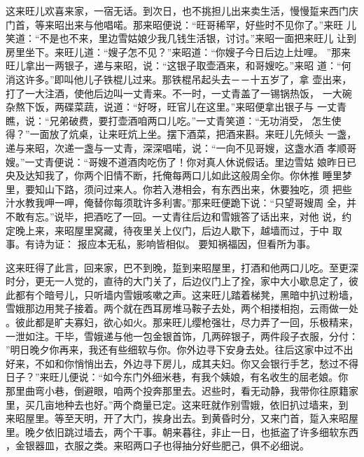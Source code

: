 这来旺儿欢喜来家，一宿无话。到次日，也不挑担儿出来卖生活，慢慢踅来西门庆
门首，等来昭出来与他唱喏。那来昭便说：“旺哥稀罕，好些时不见你了。”来旺
儿笑道：“不是也不来，里边雪姑娘少我几钱生活银，讨讨。”来昭一面把来旺儿
让到房里坐下。来旺儿道：“嫂子怎不见？”来昭道：“你嫂子今日后边上灶哩。
”那来旺儿拿出一两银子，递与来昭，说：“这银子取壶酒来，和哥嫂吃。”来昭
道：“何消这许多。”即叫他儿子铁棍儿过来。那铁棍吊起头去－－十五岁了，拿
壶出来，打了一大注酒，使他后边叫一丈青来。不一时，一丈青盖了一锡锅热饭，
一大碗杂熬下饭，两碟菜蔬，说道：“好呀，旺官儿在这里。”来昭便拿出银子与
一丈青瞧，说：“兄弟破费，要打壶酒咱两口儿吃。”一丈青笑道：“无功消受，
怎生使得？”一面放了炕桌，让来旺炕上坐。摆下酒菜，把酒来斟。来旺儿先倾头
一盏，递与来昭，次递一盏与一丈青，深深唱喏，说：“一向不见哥嫂，这盏水酒
孝顺哥嫂。”一丈青便说：“哥嫂不道酒肉吃伤了！你对真人休说假话。里边雪姑
娘昨日已央及达知我了，你两个旧情不断，托俺每两口儿如此这般周全你。你休推
睡里梦里，要知山下路，须问过来人。你若入港相会，有东西出来，休要独吃，须
把些汁水教我呷一呷，俺替你每须耽许多利害。”那来旺便跪下说：“只望哥嫂周
全，并不敢有忘。”说毕，把酒吃了一回。一丈青往后边和雪娥答了话出来，对他
说，约定晚上来，来昭屋里窝藏，待夜里关上仪门，后边人歇下，越墙而过，于中
取事。有诗为证：
报应本无私，影响皆相似。
要知祸福因，但看所为事。

这来旺得了此言，回来家，巴不到晚，踅到来昭屋里，打酒和他两口儿吃。至更深
时分，更无一人觉的，直待的大门关了，后边仪门上了拴，家中大小歇息定了，彼
此都有个暗号儿，只听墙内雪娥咳嗽之声。这来旺儿踏着梯凳，黑暗中扒过粉墙，
雪娥那边用凳子接着。两个就在西耳房堆马鞍子去处，两个相搂相抱，云雨做一处
。彼此都是旷夫寡妇，欲心如火。那来旺儿缨枪强壮，尽力弄了一回，乐极精来，
一泄如注。干毕，雪娥递与他一包金银首饰，几两碎银子，两件段子衣服，分付：
”明日晚夕你再来，我还有些细软与你。你外边寻下安身去处。往后这家中过不出
好来，不如和你悄悄出去，外边寻下房儿，成其夫妇。你又会银行手艺，愁过不得
日子？”来旺儿便说：“如今东门外细米巷，有我个姨娘，有名收生的屈老娘。你
那里曲弯小巷，倒避眼，咱两个投奔那里去。迟些时，看无动静，我带你往原籍家
里，买几亩地种去也好。”两个商量已定。这来旺就作别雪娥，依旧扒过墙来，到
来昭屋里。等至天明，开了大门，挨身出去。到黄昏时分，又来门首，踅入来昭屋
里。晚夕依旧跳过墙去，两个干事。朝来暮往，非止一日，也抵盗了许多细软东西
，金银器皿，衣服之类。来昭两口子也得抽分好些肥己，俱不必细说。

